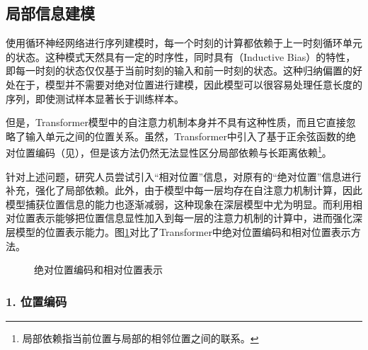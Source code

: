
\subsection{局部信息建模}\label{subsec-15.1.1}

\parinterval 使用循环神经网络进行序列建模时，每一个时刻的计算都依赖于上一时刻循环单元的状态。这种模式天然具有一定的时序性，同时具有{\small{}}（Inductive Bias）的特性，即每一时刻的状态仅仅基于当前时刻的输入和前一时刻的状态。这种归纳偏置的好处在于，模型并不需要对绝对位置进行建模，因此模型可以很容易处理任意长度的序列，即使测试样本显著长于训练样本。

\parinterval 但是，Transformer模型中的自注意力机制本身并不具有这种性质，而且它直接忽略了输入单元之间的位置关系。虽然，Transformer中引入了基于正余弦函数的绝对位置编码（见{\chaptertwelve}），但是该方法仍然无法显性区分局部依赖与长距离依赖\footnote[1]{局部依赖指当前位置与局部的相邻位置之间的联系。}。

\parinterval 针对上述问题，研究人员尝试引入“相对位置”信息，对原有的“绝对位置”信息进行补充，强化了局部依赖。此外，由于模型中每一层均存在自注意力机制计算，因此模型捕获位置信息的能力也逐渐减弱，这种现象在深层模型中尤为明显。而利用相对位置表示能够把位置信息显性加入到每一层的注意力机制的计算中，进而强化深层模型的位置表示能力。图\ref{fig:15-1}对比了Transformer中绝对位置编码和相对位置表示方法。

\begin{figure}[htp]
\centering

\caption{绝对位置编码和相对位置表示}
\label{fig:15-1}
\end{figure}


\subsubsection{1. 位置编码}\label{subsubsec-15.1.1}

